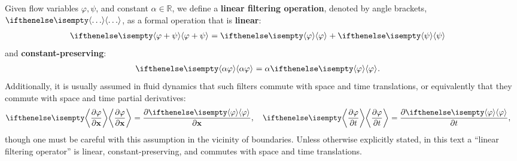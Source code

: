 \begin{definition}\label{def:linearFiltering}
    Given flow variables $\varphi, \psi$, and constant $\alpha \in \mathbb{R}$, we define a \textbf{linear filtering operation}, denoted by angle brackets, $\filter{\dots}$, as a formal operation that is \textbf{linear}:
    \begin{align}
        \filter{\varphi + \psi}
        &=
        \filter{\varphi}
      + \filter{\psi}
        \label{eq:filter_linearity}
    \end{align}
    and \textbf{constant-preserving}:
    \begin{align}
        \filter{\alpha\varphi}
        &=
        \alpha\filter{\varphi}.
    \end{align}
    Additionally, it is usually assumed in fluid dynamics that such filters commute with space and time translations, or equivalently that they commute with space and time partial derivatives:
    \begin{align}
        \filter{\pdv{\varphi}{\vec{x}}}
        =
        \pdv{\filter{\varphi}}{\vec{x}},
        \quad
        \filter{\pdv{\varphi}{t}}
        &=
        \pdv{\filter{\varphi}}{t}
        \label{eq:filter_commutation},
    \end{align}
    though one must be careful with this assumption in the vicinity of boundaries.
    Unless otherwise explicitly stated, in this text a ``linear filtering operator'' is linear, constant-preserving, and commutes with space and time translations.
\end{definition}

